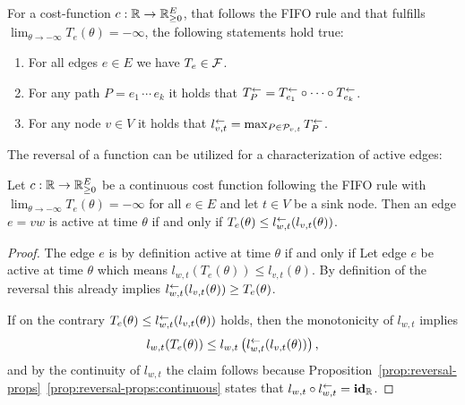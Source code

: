 \begin{corollary}
    For a cost-function $c:\mathbb{R}\rightarrow\mathbb{R}_{\geq0}^E$, that follows the FIFO rule and that fulfills $\lim_{\theta\to-\infty} T_e(\theta) = -\infty$, the following statements hold true:
    \begin{enumerate}[label=(\roman*)]
        \item For all edges $e\in E$ we have $T_e \in \mathcal{F}$.
        \item\label{prop:reversal-props:paths} For any path $P=e_1\,\cdots \,e_k$ it holds that $T_P^{\leftarrow} = T_{e_1}^{\leftarrow} \circ \cdots \circ T_{e_k}^{\leftarrow}$.
        \item For any node $v\in V$ it holds that $l_{v,t}^{\leftarrow} = \max_{P\in\mathcal{P}_{v,t}} T_P^{\leftarrow}$.
    \end{enumerate}
\end{corollary}

The reversal of a function can be utilized for a characterization of active edges:

\begin{lemma}
    Let $c: \mathbb{R}\rightarrow\mathbb{R}_{\geq0}^E$ be a continuous cost function following the FIFO rule with $\lim_{\theta\to-\infty} T_e(\theta) = -\infty$ for all $e\in E$ and let $t\in V$ be a sink node.
    Then an edge $e=vw$ is active at time $\theta$ if and only if $T_e(\theta) \leq l_{w,t}^{\leftarrow}( l_{v,t}(\theta) )$.
\end{lemma}
\begin{proof}
    The edge $e$ is by definition active at time $\theta$ if and only if 
    Let edge $e$ be active at time $\theta$ which means $l_{w,t}(T_e(\theta)) \leq l_{v,t}(\theta)$.
    By definition of the reversal this already implies $l_{w,t}^{\leftarrow}(l_{v,t}(\theta)) \geq T_e(\theta)$.

    If on the contrary $T_e(\theta) \leq l_{w,t}^{\leftarrow}( l_{v,t}(\theta) )$ holds, then the monotonicity of $l_{w,t}$ implies 
    \[
        l_{w,t}( T_e(\theta) ) \leq l_{w,t}\left(l_{w,t}^{\leftarrow}(l_{v,t}(\theta))\right),
    \]
    and by the continuity of $l_{w,t}$ the claim follows because Proposition~\ref{prop:reversal-props}~\ref{prop:reversal-props:continuous} states that $l_{w,t} \circ l_{w,t}^{\leftarrow} = \mathbf{id}_{\mathbb{R}}$. 
\end{proof}